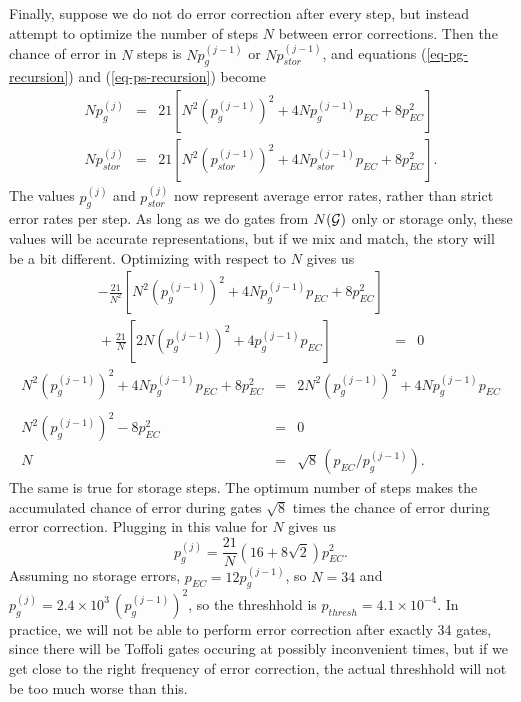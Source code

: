 \documentclass{report}
\newcommand{\G}{{\cal G}}
\newcommand{\pgj}[1]{p_g^{({#1})}}
\newcommand{\psj}[1]{p_{stor}^{({#1})}}
\begin{document}
Finally, suppose we do not do error correction after every step, but instead 
attempt to optimize the number of steps $N$ between error corrections.  
Then the chance of error in $N$ steps is $N \pgj{j-1}$ or $N \psj{j-1}$, and 
equations (\ref{eq-pg-recursion}) and (\ref{eq-ps-recursion}) become
\begin{eqnarray}
N \pgj{j} & = & 21 \left[N^2 (\pgj{j-1})^2 + 4 N \pgj{j-1} p_{EC} + 8 p_{EC}^2
\right] \\
N \psj{j} & = & 21 \left[N^2 (\psj{j-1})^2 + 4 N \psj{j-1} p_{EC} + 8 p_{EC}^2
\right].
\end{eqnarray}
The values $\pgj{j}$ and $\psj{j}$ now represent average error rates, 
rather than strict error rates per step.  As long as we do gates from 
$N(\G)$ only or storage only, these values will be accurate representations, 
but if we mix and match, the story will be a bit different.  Optimizing with 
respect to $N$ gives us
\begin{eqnarray}
-\frac{21}{N^2} \left[N^2 (\pgj{j-1})^2 + 4 N \pgj{j-1} p_{EC} + 8 p_{EC}^2
\right] & & \\
\mbox{} + \frac{21}{N} \left[2 N (\pgj{j-1})^2 + 4 \pgj{j-1} p_{EC} \right]
& = & 0
\end{eqnarray}
\vspace{-\belowdisplayskip}
\begin{eqnarray}
N^2 (\pgj{j-1})^2 + 4 N \pgj{j-1} p_{EC} + 8 p_{EC}^2 & = & 2 N^2 
(\pgj{j-1})^2 + 4 N \pgj{j-1} p_{EC} \nonumber \\ \\
N^2 (\pgj{j-1})^2 - 8 p_{EC}^2 & = & 0 \\
N & = & \sqrt{8}\,(p_{EC}/\pgj{j-1}).
\end{eqnarray}
The same is true for storage steps.  The optimum number of steps makes 
the accumulated chance of error during gates $\sqrt{8}$ times the chance 
of error during error correction.  Plugging in this value for $N$ gives us
\begin{equation}
\pgj{j} = \frac{21}{N} (16 + 8 \sqrt{2}) p_{EC}^2.
\end{equation}
Assuming no storage errors, $p_{EC} = 12 \pgj{j-1}$, so $N = 
34$ and $\pgj{j} = 2.4 \times 10^3\,(\pgj{j-1})^2$, so the threshhold is 
$p_{thresh} = 4.1 \times 10^{-4}$.  In practice, we will not be able to perform 
error correction after exactly 34 gates, since there will be Toffoli gates 
occuring at possibly inconvenient times, but if we get close to the right 
frequency of error correction, the actual threshhold will not be too much 
worse than this.
\end{document}
